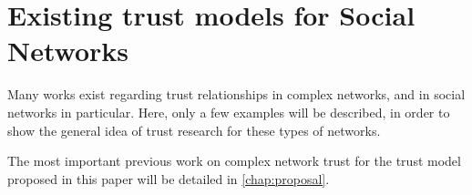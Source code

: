 \section{Existing trust models for Social Networks}

Many works exist regarding trust relationships in complex networks, and in social networks in particular.
Here, only a few examples will be described, in order to show the general idea of trust research for these types of networks.

The most important previous work on complex network trust for the trust model proposed in this paper will be detailed in \autoref{chap:proposal}.

